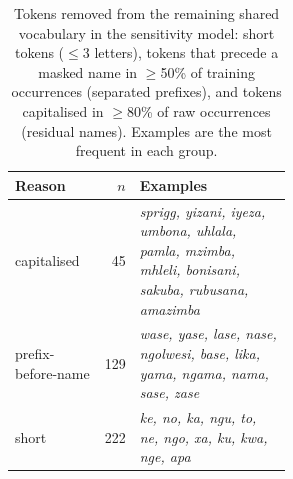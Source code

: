 \begin{table}[h]\centering\small\caption{Tokens removed from the remaining shared vocabulary in the sensitivity model: short tokens ($\leq$3 letters), tokens that precede a masked name in $\geq$50\% of training occurrences (separated prefixes), and tokens capitalised in $\geq$80\% of raw occurrences (residual names). Examples are the most frequent in each group.}
\begin{tabular}{@{}lrp{0.55\linewidth}@{}}\toprule Reason & $n$ & Examples \\ \midrule
capitalised & 45 & \emph{sprigg, yizani, iyeza, umbona, uhlala, pamla, mzimba, mhleli, bonisani, sakuba, rubusana, amazimba} \\
prefix-before-name & 129 & \emph{wase, yase, lase, nase, ngolwesi, base, lika, yama, ngama, nama, sase, zase} \\
short & 222 & \emph{ke, no, ka, ngu, to, ne, ngo, xa, ku, kwa, nge, apa} \\
\bottomrule\end{tabular}\label{tab:excluded}\end{table}
